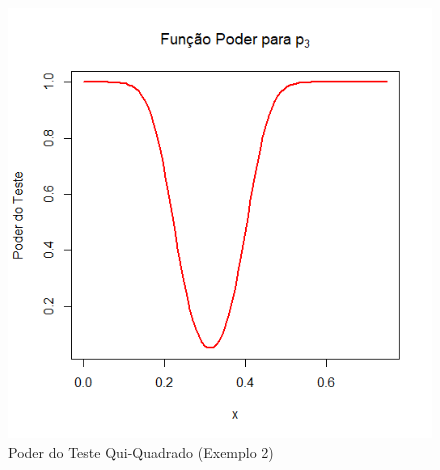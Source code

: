 \documentclass[12pt]{beamer}
\begin{document}
\begin{frame}{}
\begin{block}{}
\begin{figure}
    \centering
    \includegraphics[scale=0.5]{Aula13ChiSquareTests/figs/Ex2p3.png}
    \caption{Poder do Teste Qui-Quadrado (Exemplo 2)}
    \label{fig:enter-label}
\end{figure}
\end{block}
\end{frame}
\end{document}
